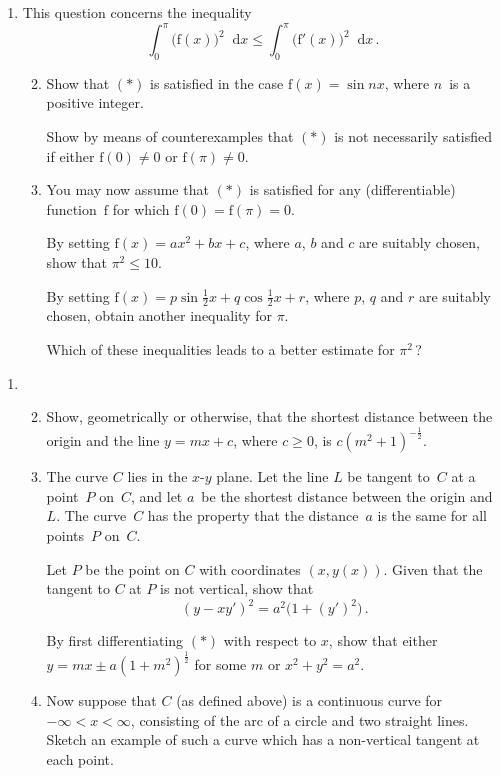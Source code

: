 \documentclass[a4, 11pt]{report}
\newlength{\qspace}
\newcounter{qnumber}
\newenvironment{question}%
 {\vspace{\qspace}
  \begin{enumerate}[\bfseries 1\quad][10]%
    \setcounter{enumi}{\value{qnumber}}%
    \item%
 }
{
  \end{enumerate}
  \filbreak
  \stepcounter{qnumber}
 }
\newenvironment{questionparts}[1][1]%
 {
  \begin{enumerate}[\bfseries (i)]%
    \setcounter{enumii}{#1}
    \addtocounter{enumii}{-1}
    \setlength{\itemsep}{5mm}
    \setlength{\parskip}{8pt}
 }
 {
  \end{enumerate}
 }
\def\le{\leqslant}
\def\ge{\geqslant}
\renewcommand{\.}[1]{\ensuremath{\mathrm{#1}}}
\newcommand{\+}[1]{\ensuremath{\mathbf{#1}}}
\newcommand{\ud}{\mathop{}\!\mathrm{d}}
\begin{document}
\begin{question}
  This question concerns the  inequality
  \begin{equation}
    \label{eq6:*}
    \int_0^\pi  \bigl( \.f(x) \bigr)^2 \ud x \le \int_0^\pi \bigl(
    \.f'(x)\bigr)^2 \ud x\,.\tag{$*$}
  \end{equation}

  \begin{questionparts}
  \item Show that $(*)$ is satisfied in the case
    $\.f(x)=\sin nx$, where $n$~is a positive integer.

Show by means of counterexamples that  $(*)$ is not
necessarily satisfied if either $\.f(0) \ne 0$ or $\.f(\pi)\ne0$.
 

\item  You may now assume that
 $(*)$ is satisfied for any 
(differentiable) function~$\.f$ for which $\.f(0)=\.f(\pi)=0$.

 By setting $\.f(x) = ax^2 + bx +c$,
 where $a$, $b$ and $c$ are suitably chosen, show that 
$\pi^2\le 10$.

 By setting $\.f(x) = p \sin \frac12 x + q\cos \frac12 x +r$,
    where $p$, $q$ and $r$ are suitably chosen, obtain another inequality
    for $\pi$.

Which of these inequalities leads to a better estimate for $\pi^2\,$?
  \end{questionparts}
\end{question}

\begin{question}
\begin{questionparts}
\item
Show, geometrically or otherwise, that the shortest distance between the 
origin and the line
$y= mx+c$, where $c\ge0$,  is $c(m^2+1)^{-\frac12}$. 

\item
  The curve $C$ lies in the $x$-$y$ plane. Let the line $L$ be tangent
  to~$C$ at a point~$P$ on~$C$, and let $a$~be the shortest distance
  between the origin and $L$.  The curve~$C$ has
  the property that the distance~$a$ is the same for all points~$P$
  on~$C$.

 Let $P$ be the point on $C$ with coordinates $(x,y(x))$. Given that the 
tangent to $C$ at $P$ is not vertical, show that
    \begin{equation}
      \label{eq:8*}
  (y-xy')^2 =  a^2\big (1+(y')^2 \big) 
\,.
  \tag{$*$}
    \end{equation}

 By first differentiating $(*)$ with respect to $x$,
show
that either $y= mx \pm a(1+m^2)^{\frac12}$ for some $m$
or $x^2+y^2 =a^2$. 

\item  Now suppose that $C$ (as defined above) is a continuous curve
for $-\infty < x < \infty$,  consisting of the arc of a circle and two
straight lines. Sketch an example of 
such a curve which has a non-vertical tangent at each point.

  \end{questionparts}
\end{question}
\end{document}
